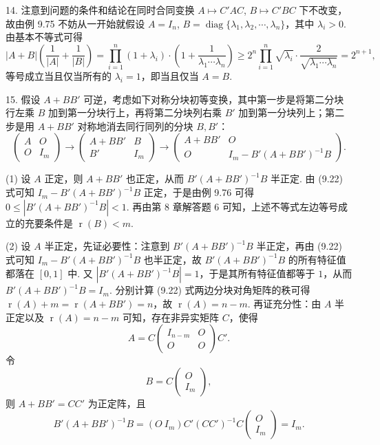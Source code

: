 \documentclass[UTF8, 12pt, fontset=fandol, oneside]{ctexart}
\begin{document}
14. 注意到问题的条件和结论在同时合同变换 $A\mapsto C'AC$, $B\mapsto C'BC$ 下不改变，故由例 9.75 不妨从一开始就假设 $A=I_n$, $B=\operatorname{diag}\{\lambda_1,\lambda_2,\cdots,\lambda_n\}$，其中 $\lambda_i>0$. 由基本不等式可得
\[
|A+B|\left(\frac{1}{|A|}+\frac{1}{|B|}\right)
=\prod_{i=1}^n(1+\lambda_i)\cdot\left(1+\frac{1}{\lambda_1\cdots\lambda_n}\right)
\ge 2^n\prod_{i=1}^n\sqrt{\lambda_i}\cdot\frac{2}{\sqrt{\lambda_1\cdots\lambda_n}}=2^{n+1},
\]
等号成立当且仅当所有的 $\lambda_i=1$，即当且仅当 $A=B$.

15. 假设 $A+BB'$ 可逆，考虑如下对称分块初等变换，其中第一步是将第二分块行左乘 $B$ 加到第一分块行上，再将第二分块列右乘 $B'$ 加到第一分块列上；第二步是用 $A+BB'$ 对称地消去同行同列的分块 $B,B'$：
\[
\begin{pmatrix}
A&O\\
O&I_m
\end{pmatrix}
\to
\begin{pmatrix}
A+BB'&B\\
B'&I_m
\end{pmatrix}
\to
\begin{pmatrix}
A+BB'&O\\
O&I_m-B'(A+BB')^{-1}B
\end{pmatrix}.
\tag{9.22}
\]

(1) 设 $A$ 正定，则 $A+BB'$ 也正定，从而 $B'(A+BB')^{-1}B$ 半正定. 由 (9.22) 式可知 $I_m-B'(A+BB')^{-1}B$ 正定，于是由例 9.76 可得 $0\le |B'(A+BB')^{-1}B|<1$. 再由第 8 章解答题 6 可知，上述不等式左边等号成立的充要条件是 $\operatorname{r}(B)<m$.

(2) 设 $A$ 半正定，先证必要性：注意到 $B'(A+BB')^{-1}B$ 半正定，再由 (9.22) 式可知 $I_m-B'(A+BB')^{-1}B$ 也半正定，故 $B'(A+BB')^{-1}B$ 的所有特征值都落在 $[0,1]$ 中. 又 $|B'(A+BB')^{-1}B|=1$，于是其所有特征值都等于 $1$，从而 $B'(A+BB')^{-1}B=I_m$. 分别计算 (9.22) 式两边分块对角矩阵的秩可得 $\operatorname{r}(A)+m=\operatorname{r}(A+BB')=n$，故 $\operatorname{r}(A)=n-m$. 再证充分性：由 $A$ 半正定以及 $\operatorname{r}(A)=n-m$ 可知，存在非异实矩阵 $C$，使得
\[
A=C\begin{pmatrix}
I_{n-m}&O\\
O&O
\end{pmatrix}C'.
\]
令
\[
B=C\begin{pmatrix}
O\\
I_m
\end{pmatrix},
\]
则 $A+BB'=CC'$ 为正定阵，且
\[
B'(A+BB')^{-1}B=(O\ I_m)C'(CC')^{-1}C\begin{pmatrix}
O\\
I_m
\end{pmatrix}=I_m.
\]
\end{document}
